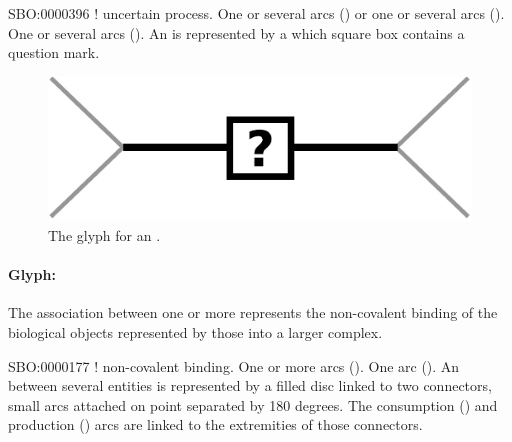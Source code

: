 \begin{glyphDescription}
 \glyphSboTerm SBO:0000396 ! uncertain process.
 \glyphOrigin One or several  arcs () or one or several  arcs ().
 \glyphTarget One or several  arcs ().
 \glyphNode An  is represented by a  which square box contains a question mark.
 \end{glyphDescription}

\begin{figure}[H]
  \centering
  \includegraphics[scale = 0.5]{images/uncertain}
  \caption{The \PD glyph for an .}
  \label{fig:uncertain}
\end{figure}



\paragraph{Glyph: }\label{sec:association}

The association between one or more  represents the non-covalent binding of the biological objects represented by those  into a larger complex.

\begin{glyphDescription}
 \glyphSboTerm SBO:0000177 ! non-covalent binding.
 \glyphOrigin One or more  arcs ().
 \glyphTarget  One  arc ().
 \glyphNode An  between several entities is represented by a filled disc linked to two connectors, small arcs attached on point separated by 180 degrees. The consumption () and production () arcs are linked to the extremities of those connectors. 
 \end{glyphDescription}

